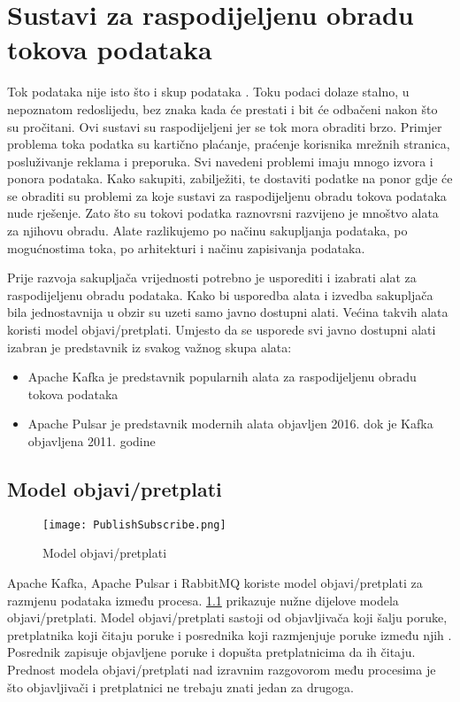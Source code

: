 \documentclass[utf8, diplomski, lmodern, numeric]{fer}
\begin{document}
\chapter{Sustavi za raspodijeljenu obradu tokova podataka}

Tok podataka nije isto što i skup podataka \citep{ilprints535}. Toku podaci dolaze stalno, u nepoznatom redoslijedu, bez znaka kada će prestati i bit će odbačeni nakon što su pročitani. Ovi sustavi su raspodijeljeni jer se tok mora obraditi brzo. Primjer problema toka podatka su kartično plaćanje, praćenje korisnika mrežnih stranica, posluživanje reklama i preporuka. Svi navedeni problemi imaju mnogo izvora i ponora podataka. Kako sakupiti, zabilježiti, te dostaviti podatke na ponor gdje će se obraditi su problemi za koje sustavi za raspodijeljenu obradu tokova podataka nude rješenje. Zato što su tokovi podatka raznovrsni razvijeno je mnoštvo alata za njihovu obradu. Alate razlikujemo po načinu sakupljanja podataka, po mogućnostima toka, po arhitekturi i načinu zapisivanja podataka.

Prije razvoja sakupljača vrijednosti potrebno je usporediti i izabrati alat za raspodijeljenu obradu podataka. Kako bi usporedba alata i izvedba sakupljača bila jednostavnija u obzir su uzeti samo javno dostupni alati. Većina takvih alata koristi model objavi/pretplati. Umjesto da se usporede svi javno dostupni alati izabran je predstavnik iz svakog važnog skupa alata:
\begin{itemize}
    \item Apache Kafka je predstavnik popularnih alata za raspodijeljenu obradu tokova podataka
    \item Apache Pulsar \citep{yahoo-blogpost} je predstavnik modernih alata objavljen 2016. dok je Kafka \citep{kafka-whitepaper} objavljena 2011. godine
\end{itemize}


\section{Model objavi/pretplati}

\begin{figure}[H]
    \centering
    \texttt{[image: PublishSubscribe.png]}
    \caption{Model objavi/pretplati}
    \label{fig:publish-subscribe}
\end{figure}

Apache Kafka, Apache Pulsar i RabbitMQ koriste model objavi/pretplati za razmjenu podataka između procesa. \ref{fig:publish-subscribe} prikazuje nužne dijelove modela objavi/pretplati. Model objavi/pretplati sastoji od objavljivača koji šalju poruke, pretplatnika koji čitaju poruke i posrednika koji razmjenjuje poruke između njih \citep{rassus-manual}. Posrednik zapisuje objavljene poruke i dopušta pretplatnicima da ih čitaju. Prednost modela objavi/pretplati nad izravnim razgovorom među procesima je što objavljivači i pretplatnici ne trebaju znati jedan za drugoga.
\end{document}
